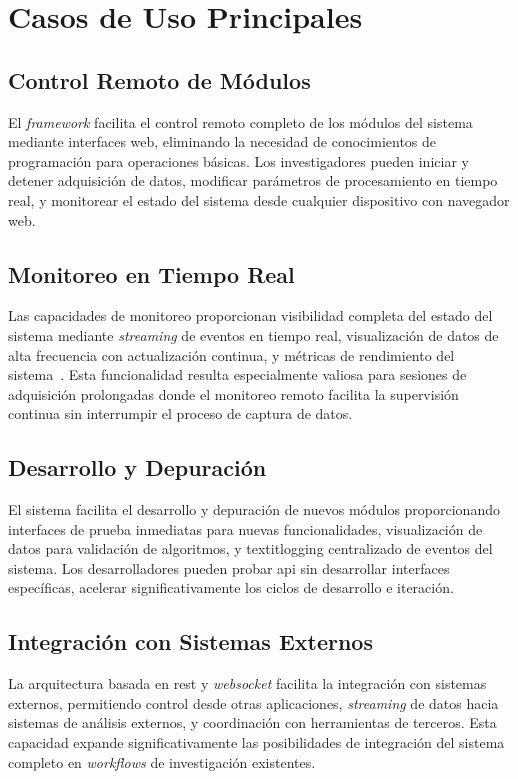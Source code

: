 \section{Casos de Uso Principales}
\label{sec:casos_uso_api_explorer}

\subsection{Control Remoto de Módulos}
\label{subsec:control_remoto}

El \textit{\gls{framework}} facilita el control remoto completo de los módulos del sistema mediante interfaces web, eliminando la necesidad de conocimientos de programación para operaciones básicas. Los investigadores pueden iniciar y detener adquisición de datos, modificar parámetros de procesamiento en tiempo real, y monitorear el estado del sistema desde cualquier dispositivo con navegador web.

\subsection{Monitoreo en Tiempo Real}
\label{subsec:monitoreo_tiempo_real}

Las capacidades de monitoreo proporcionan visibilidad completa del estado del sistema mediante \textit{streaming} de eventos en tiempo real, visualización de datos de alta frecuencia con actualización continua, y métricas de rendimiento del sistema~\cite{Mullen2015}. Esta funcionalidad resulta especialmente valiosa para sesiones de adquisición prolongadas donde el monitoreo remoto facilita la supervisión continua sin interrumpir el proceso de captura de datos.

\subsection{Desarrollo y Depuración}
\label{subsec:desarrollo_depuracion}

El sistema facilita el desarrollo y depuración de nuevos módulos proporcionando interfaces de prueba inmediatas para nuevas funcionalidades, visualización de datos para validación de algoritmos, y textit{logging} centralizado de eventos del sistema. Los desarrolladores pueden probar \acrshort{api} sin desarrollar interfaces específicas, acelerar significativamente los ciclos de desarrollo e iteración.

\subsection{Integración con Sistemas Externos}
\label{subsec:integracion_sistemas_externos}

La arquitectura basada en \acrshort{rest} y \textit{\gls{websocket}} facilita la integración con sistemas externos, permitiendo control desde otras aplicaciones, \textit{streaming} de datos hacia sistemas de análisis externos, y coordinación con herramientas de terceros. Esta capacidad expande significativamente las posibilidades de integración del sistema completo en \textit{workflows} de investigación existentes.